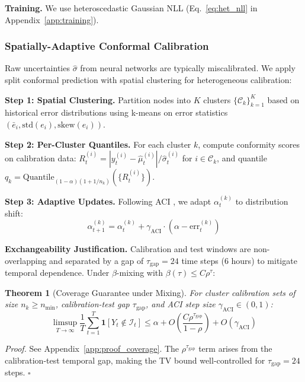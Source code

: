 \documentclass{article}
\theoremstyle{plain}
\newtheorem{theorem}{Theorem}[section]
\theoremstyle{definition}
\theoremstyle{remark}
\begin{document}
\textbf{Training.} We use heteroscedastic Gaussian NLL (Eq.~\ref{eq:het_nll} in Appendix~\ref{app:training}).

\subsubsection{Spatially-Adaptive Conformal Calibration}

Raw uncertainties $\hat{\sigma}$ from neural networks are typically miscalibrated. We apply split conformal prediction \citep{vovk2005algorithmic,romano2019conformalized} with spatial clustering for heterogeneous calibration:

\textbf{Step 1: Spatial Clustering.} Partition nodes into $K$ clusters $\{\mathcal{C}_k\}_{k=1}^K$ based on historical error distributions using k-means on error statistics $(\bar{e}_i, \text{std}(e_i), \text{skew}(e_i))$.

\textbf{Step 2: Per-Cluster Quantiles.} For each cluster $k$, compute conformity scores on calibration data: $R_t^{(i)} = |y_t^{(i)} - \hat{\mu}_t^{(i)}|/\hat{\sigma}_t^{(i)}$ for $i \in \mathcal{C}_k$, and quantile $q_k = \text{Quantile}_{(1-\alpha)(1 + 1/n_k)}(\{R_t^{(i)}\})$.

\textbf{Step 3: Adaptive Updates.} Following ACI \citep{gibbs2021adaptive}, we adapt $\alpha_t^{(k)}$ to distribution shift:
\begin{equation}
\alpha_{t+1}^{(k)} = \alpha_t^{(k)} + \gamma_{\text{ACI}} \cdot (\alpha - \text{err}_t^{(k)})
\label{eq:aci}
\end{equation}

\textbf{Exchangeability Justification.} Calibration and test windows are non-overlapping and separated by a gap of $\tau_{\text{gap}} = 24$ time steps (6 hours) to mitigate temporal dependence. Under $\beta$-mixing with $\beta(\tau) \leq C\rho^\tau$:

\begin{theorem}[Coverage Guarantee under Mixing]
\label{thm:coverage}
For cluster calibration sets of size $n_k \geq n_{\min}$, calibration-test gap $\tau_{\text{gap}}$, and ACI step size $\gamma_{\text{ACI}} \in (0,1)$:
\begin{equation}
\limsup_{T \to \infty} \frac{1}{T}\sum_{t=1}^T \mathbf{1}[Y_t \notin \mathcal{I}_t] \leq \alpha + O\left(\frac{C\rho^{\tau_{\text{gap}}}}{1-\rho}\right) + O(\gamma_{\text{ACI}})
\end{equation}
\end{theorem}

\emph{Proof.} See Appendix~\ref{app:proof_coverage}. The $\rho^{\tau_{\text{gap}}}$ term arises from the calibration-test temporal gap, making the TV bound well-controlled for $\tau_{\text{gap}} = 24$ steps. \hfill $\square$
\end{document}
